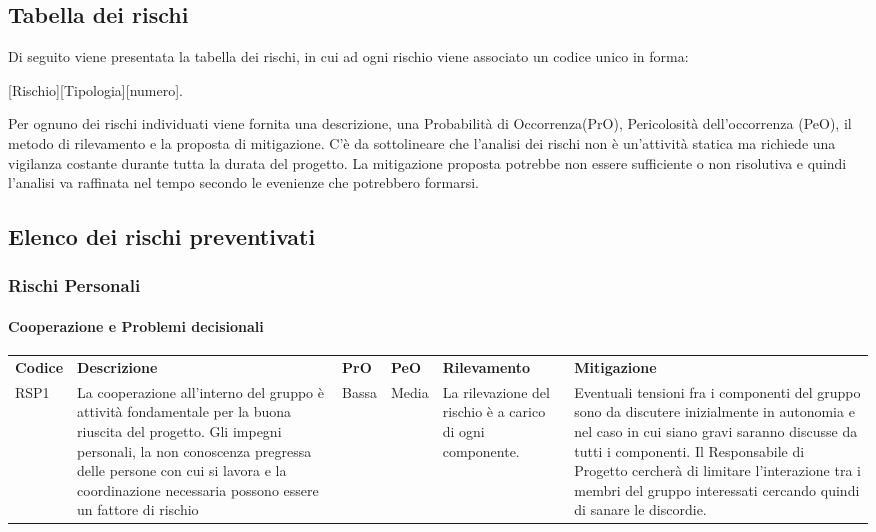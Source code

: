 \subsection{Tabella dei rischi}
Di seguito viene presentata la tabella dei rischi, in cui ad ogni rischio viene associato un codice unico in forma:
\begin{center}
	[Rischio][Tipologia][numero]. 
\end{center}
 Per ognuno dei rischi individuati viene fornita una descrizione, una Probabilità di Occorrenza(PrO), Pericolosità dell'occorrenza (PeO), il metodo di rilevamento e la proposta di mitigazione. C'è da sottolineare che l'analisi dei rischi non è un'attività statica ma richiede una vigilanza costante durante tutta la durata del progetto. La mitigazione proposta potrebbe non essere sufficiente o non risolutiva e quindi l'analisi va raffinata nel tempo secondo le evenienze che potrebbero formarsi.

\newpage
		
\subsection{Elenco dei rischi preventivati}

\subsubsection{Rischi Personali}
\paragraph{Cooperazione e Problemi decisionali}
\begin{center}
	\begin{longtable}{p{1cm}|p{4cm}|p{0.7cm}|p{0.7cm}|p{3cm}|p{4cm}}
		\arrayrulecolor{lightest-grayest}
		\rowcolor{blue!20}
		\textbf{Codice} & 
		\textbf{Descrizione} &
		\textbf{PrO}  &
		\textbf{PeO}  &				        
		\textbf{Rilevamento} &
		\textbf{Mitigazione} \\	
		RSP1 & La cooperazione all'interno del gruppo è attività fondamentale per la buona riuscita del progetto. Gli impegni personali, la non conoscenza pregressa delle persone con cui si lavora e la coordinazione necessaria possono essere un fattore di rischio & Bassa & Media & La rilevazione del rischio è a carico di ogni componente. & Eventuali tensioni fra i componenti del gruppo sono da discutere inizialmente in autonomia e nel caso in cui siano gravi saranno discusse da tutti i componenti. Il Responsabile di Progetto cercherà di limitare l'interazione tra i membri del gruppo interessati cercando quindi di sanare le discordie. \\
		\end{longtable}
\end{center}


